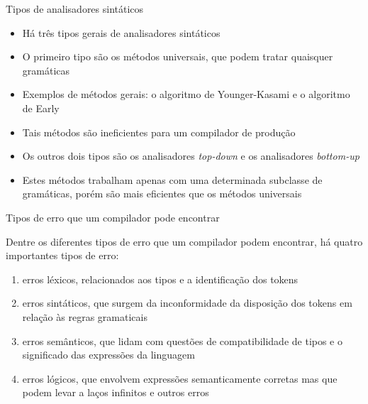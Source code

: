 \begin{frame}[fragile]{Tipos de analisadores sintáticos}

    \begin{itemize}
        \item Há três tipos gerais de analisadores sintáticos
        \pause

        \item O primeiro tipo são os métodos universais, que podem tratar quaisquer gramáticas
        \pause

        \item Exemplos de métodos gerais: o algoritmo de Younger-Kasami e o algoritmo de Early
        \pause

        \item Tais métodos são ineficientes para um compilador de produção
        \pause

        \item Os outros dois tipos são os analisadores \textit{top-down} e os analisadores \textit{bottom-up}
        \pause

        \item Estes métodos trabalham apenas com uma determinada subclasse de gramáticas, porém são mais eficientes que os métodos universais
    \end{itemize}

\end{frame}

\begin{frame}[fragile]{Tipos de erro que um compilador pode encontrar}

    Dentre os diferentes tipos de erro que um compilador podem encontrar, há quatro importantes tipos de erro:
    \pause

    \vspace{0.1in}

    \begin{enumerate}
        \item erros léxicos, relacionados aos tipos e a identificação dos tokens
        \pause

        \item erros sintáticos, que surgem da inconformidade da disposição dos tokens em relação às regras gramaticais
        \pause

        \item erros semânticos, que lidam com questões de compatibilidade de tipos e o significado das expressões da linguagem
        \pause

        \item erros lógicos, que envolvem expressões semanticamente corretas mas que podem levar a laços infinitos e outros erros
    \end{enumerate}

\end{frame}


